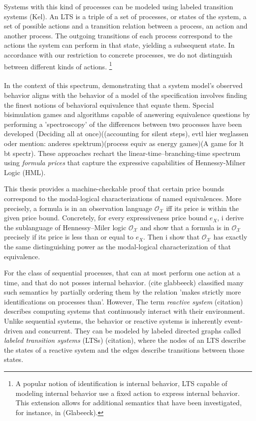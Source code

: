 \begin{isabellebody}
\begin{isamarkuptext}
Systems with this kind of processes can be modeled using labeled transition systems (Kel). An LTS is a triple of a set of processes, or states of the system,
a set of possible actions and a transition relation between a process, an action and another process. The outgoing transitions of each process correspond to the actions the system can perform in that state, 
yielding a subsequent state. In accordance with our restriction to concrete processes, we do not distinguish between different kinds of actions. 
\footnote{A popular notion of identification is internal behavior, LTS capable of modeling internal behavior use a fixed action to express internal behavior. This extension allows for additional semantics that have been investigated, for instance, in (Glabeeck).}
\\\\
In the context of this spectrum, demonstrating that a system model's observed behavior aligns with the behavior of a model of the specification involves 
finding the finest notions of behavioral equivalence that equate them. Special bisimulation games and algorithms capable of answering equivalence questions 
by performing a 'spectroscopy' of the differences between two processes have been developed (Deciding all at once)((accounting for silent steps), evtl hier weglassen oder mention: anderes spektrum)(process equiv as energy games)(A game for lt bt spectr).
These approaches rechart the linear-time--branching-time spectrum using \textit{formula prices} that capture the expressive capabilities of Hennessy-Milner Logic (HML).

This thesis provides a machine-checkable proof that certain price bounds correspond to the modal-logical characterizations of named equivalences. 
More precisely, a formula \isa{{\isasymphi}} is in an observation language $\mathcal{O_X}$ iff its price is within the given price bound.
Concretely, for every expressiveness price bound $e_X$, i derive the sublanguage of Hennessy--Miler logic $\mathcal{O_X}$ and show that a formula \isa{{\isasymphi}} is in $\mathcal{O_X}$ precisely if its price  is less than or equal to $e_X$.
Then i show that $\mathcal{O_X}$ has exactly the same distinguishing power as the modal-logical characterization of that equivalence.

For the class of sequential processes, that can at most perform one action at a time, and that do not posses internal behavior.
(cite glabbeeck) classified many such semantics by partially ordering them by the relation 'makes strictly more identifications on processes than'. However,
The term \emph{reactive system} (citation) describes computing systems that continuously interact with their environment. Unlike sequential systems, 
the behavior or reactive systems is inherently event-driven and concurrent. They can be modeled by labeled directed graphs called \emph{labeled transition systems} (LTSs) (citation),
where the nodes of an LTS describe the states of a reactive system and the edges describe transitions between those states.



\end{isamarkuptext}
\end{isabellebody}
